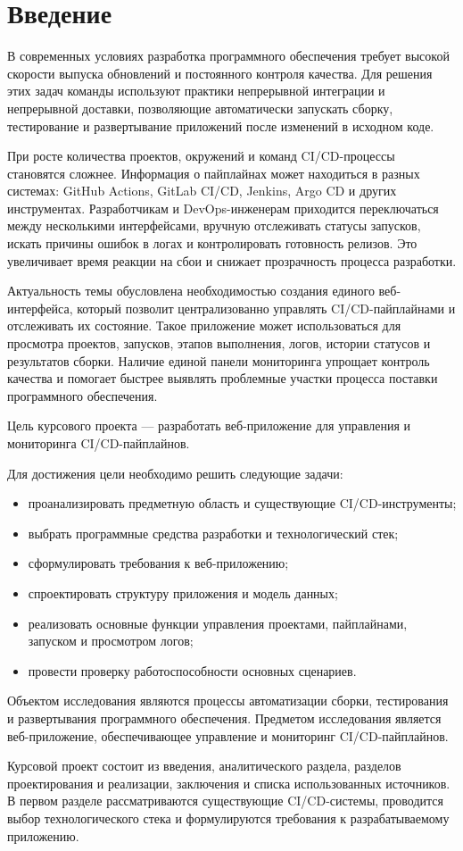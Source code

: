 \section*{Введение}

В современных условиях разработка программного обеспечения требует высокой скорости выпуска обновлений и постоянного контроля качества. Для решения этих задач команды используют практики непрерывной интеграции и непрерывной доставки, позволяющие автоматически запускать сборку, тестирование и развертывание приложений после изменений в исходном коде.

При росте количества проектов, окружений и команд CI/CD-процессы становятся сложнее. Информация о пайплайнах может находиться в разных системах: GitHub Actions, GitLab CI/CD, Jenkins, Argo CD и других инструментах. Разработчикам и DevOps-инженерам приходится переключаться между несколькими интерфейсами, вручную отслеживать статусы запусков, искать причины ошибок в логах и контролировать готовность релизов. Это увеличивает время реакции на сбои и снижает прозрачность процесса разработки.

Актуальность темы обусловлена необходимостью создания единого веб-интерфейса, который позволит централизованно управлять CI/CD-пайплайнами и отслеживать их состояние. Такое приложение может использоваться для просмотра проектов, запусков, этапов выполнения, логов, истории статусов и результатов сборки. Наличие единой панели мониторинга упрощает контроль качества и помогает быстрее выявлять проблемные участки процесса поставки программного обеспечения.

Цель курсового проекта --- разработать веб-приложение для управления и мониторинга CI/CD-пайплайнов.

Для достижения цели необходимо решить следующие задачи:
\begin{itemize}
    \item проанализировать предметную область и существующие CI/CD-инструменты;
    \item выбрать программные средства разработки и технологический стек;
    \item сформулировать требования к веб-приложению;
    \item спроектировать структуру приложения и модель данных;
    \item реализовать основные функции управления проектами, пайплайнами, запуском и просмотром логов;
    \item провести проверку работоспособности основных сценариев.
\end{itemize}

Объектом исследования являются процессы автоматизации сборки, тестирования и развертывания программного обеспечения. Предметом исследования является веб-приложение, обеспечивающее управление и мониторинг CI/CD-пайплайнов.

Курсовой проект состоит из введения, аналитического раздела, разделов проектирования и реализации, заключения и списка использованных источников. В первом разделе рассматриваются существующие CI/CD-системы, проводится выбор технологического стека и формулируются требования к разрабатываемому приложению.
